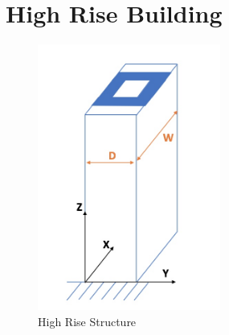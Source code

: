 \documentclass[11pt,a4paper,titlepage]{report}
\begin{document}
\section{High Rise Building}
\begin{figure}
    \centering
    \includegraphics[width=6cm]{High_rise_structure.jpeg}
    \caption{High Rise Structure}
    \label{fig:I.2 - high rise structure}
\end{figure}
\end{document}
